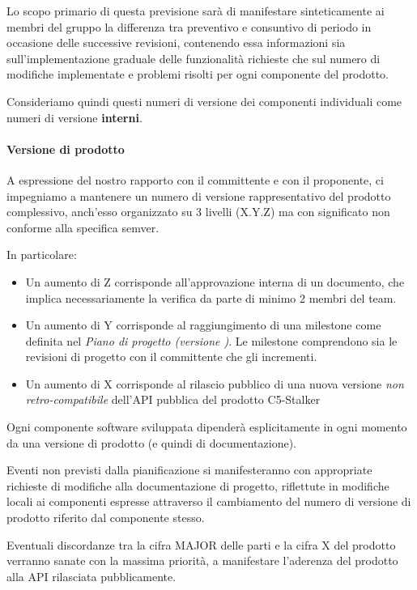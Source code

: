 \documentclass[../../norme-di-progetto.tex]{subfiles}
\begin{document}
Lo scopo primario di questa previsione sarà di manifestare sinteticamente ai membri del gruppo la differenza tra preventivo e consuntivo di periodo in occasione delle successive revisioni, contenendo essa informazioni sia sull'implementazione graduale delle funzionalità richieste che sul numero di modifiche implementate e problemi risolti per ogni componente del prodotto.

Consideriamo quindi questi numeri di versione dei componenti individuali come numeri di versione \textbf{interni}.

\paragraph{Versione di prodotto}%
\label{par:versione_di_prodotto}

A espressione del nostro rapporto con il committente e con il proponente, ci impegniamo a mantenere un numero di versione rappresentativo del prodotto complessivo, anch'esso organizzato su 3 livelli (X.Y.Z) ma con significato non conforme alla specifica semver.

In particolare:

\begin{itemize}
  \item Un aumento di Z corrisponde all'approvazione interna di un documento, che implica necessariamente la verifica da parte di minimo 2 membri del team.
  \item Un aumento di Y corrisponde al raggiungimento di una milestone come definita nel \textit{Piano di progetto (versione \versione)}. Le milestone comprendono sia le revisioni di progetto con il committente che gli incrementi.
  \item Un aumento di X corrisponde al rilascio pubblico di una nuova versione \textit{non retro-compatibile} dell'API pubblica del prodotto C5-Stalker
\end{itemize}

Ogni componente software sviluppata dipenderà esplicitamente in ogni momento da una versione di prodotto (e quindi di documentazione).

Eventi non previsti dalla pianificazione si manifesteranno con appropriate richieste di modifiche alla documentazione di progetto, riflettute in modifiche locali ai componenti espresse attraverso il cambiamento del numero di versione di prodotto riferito dal componente stesso.

Eventuali discordanze tra la cifra MAJOR delle parti e la cifra X del prodotto verranno sanate con la massima priorità, a manifestare l'aderenza del prodotto alla API rilasciata pubblicamente.
\end{document}
